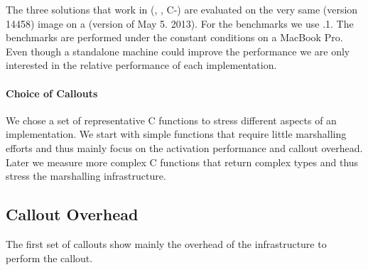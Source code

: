 The three \FFI solutions that work in \PH (\NB, \Alien, C-\FFI) are evaluated on the very same  (version 14458) image on a \PH \VM (version of May 5. 2013).
For the \Lua benchmarks we use .1.
The benchmarks are performed under the constant conditions on a MacBook Pro.
Even though a standalone machine could improve the performance we are only interested in the relative performance of each implementation.


\paragraph{Choice of Callouts}
We chose a set of representative C functions to stress different aspects of an \FFI implementation.
We start with simple functions that require little marshalling efforts and thus mainly focus on the activation performance and callout overhead.
Later we measure more complex C functions that return complex types and thus stress the marshalling infrastructure.

\subsection{Callout Overhead}

The first set of \FFI callouts show mainly the overhead of the \FFI infrastructure to perform the callout.

